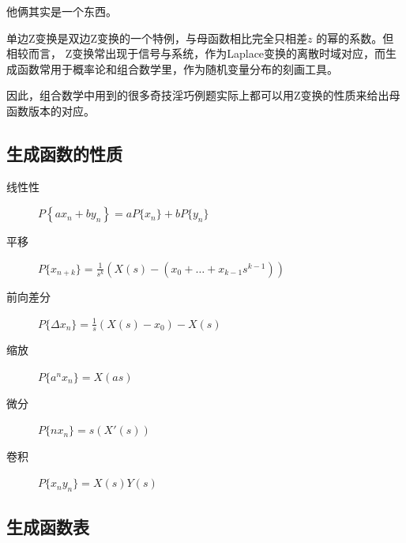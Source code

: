 \begin{note}[生成函数与Z变换的关系]
    他俩其实是一个东西。

    单边Z变换是双边Z变换的一个特例，与母函数相比完全只相差\(z\) 的幂的系数。但相较而言，
    Z变换常出现于信号与系统，作为Laplace变换的离散时域对应，而生成函数常用于概率论和组合数学里，作为随机变量分布的刻画工具。

    因此，组合数学中用到的很多奇技淫巧例题实际上都可以用Z变换的性质来给出母函数版本的对应。
\end{note}

\subsection{生成函数的性质}

\begin{description}
    \item[线性性] \(P\left\{ a x_{n}+b y_{n} \right\} = a
        P\{x_{n}\} + b P\{y_{n}\}\)
    \item[平移] \(P\{x_{n+k}\} = \frac{1}{s^{k}}
            \left( X(s) -
        (x_{0} +\dots +x_{k-1}s^{k-1} ) \right)\)
    \item[前向差分] \(P\{\Delta x_{n}\} = \frac{1}{s} \left(
        X(s)-x_{0} \right)- X(s)\)
    \item[缩放] \(P\{a^{n} x_{n}\} = X(as)\)
    \item[微分] \(P\{n x_{n}\} = s(X'(s))\)
    \item[卷积] \(P\{x_{n}y_{n}\} = X(s)Y(s)\)
\end{description}
\subsection{生成函数表}


